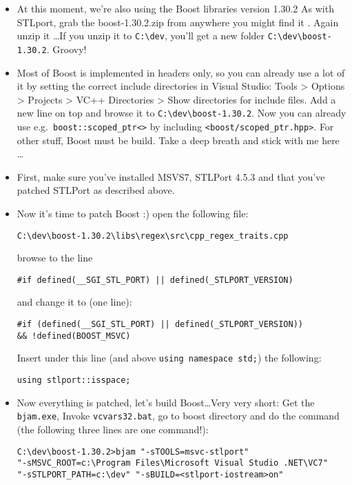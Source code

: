 \documentclass[10pt,a4paper,titlepage,dutch]{report}
\begin{document}
\begin{itemize}

\item At this moment, we're also using the Boost libraries version
1.30.2 \cite{Boost} As with STLport, grab the boost-1.30.2.zip
from anywhere you might find it \cite{Boost, Lass}.  Again unzip
it \dots  If you unzip it to \verb|C:\dev|, you'll get a new
folder \verb|C:\dev\boost-1.30.2|.  Groovy!

\item Most of Boost is implemented in headers only, so you can already
use a lot of it by setting the correct include directories in
Visual Studio: Tools > Options > Projects > VC++ Directories >
Show directories for include files.  Add a new line on top and
browse it to \verb|C:\dev\boost-1.30.2|.  Now you can already use
e.g.~\verb|boost::scoped_ptr<>| by including
\verb|<boost/scoped_ptr.hpp>|.  For other stuff, Boost must be
build.  Take a deep breath and stick with me here \dots

\item First, make sure you've installed MSVS7, STLPort 4.5.3 and that
you've patched STLPort as described above.

\item Now it's time to patch Boost :)  open the following file:

\verb|C:\dev\boost-1.30.2\libs\regex\src\cpp_regex_traits.cpp|

browse to the line

\verb?#if defined(__SGI_STL_PORT) || defined(_STLPORT_VERSION)?

and change it to (one line):

\verb?#if (defined(__SGI_STL_PORT) || defined(_STLPORT_VERSION))?\\
\verb?&& !defined(BOOST_MSVC)?

Insert under this line (and above \verb|using namespace std;|) the
following:

\verb|using stlport::isspace;|\\

\item Now everything is patched, let's build Boost\dots  Very very short: Get the \verb|bjam.exe|, Invoke
\verb|vcvars32.bat|, go to boost directory and do the command (the
following three lines are one command!):

\verb|C:\dev\boost-1.30.2>bjam "-sTOOLS=msvc-stlport"|\\
\verb|"-sMSVC_ROOT=c:\Program Files\Microsoft Visual Studio .NET\VC7"|\\
\verb|"-sSTLPORT_PATH=c:\dev" "-sBUILD=<stlport-iostream>on"|\\

\end{itemize}
\end{document}
